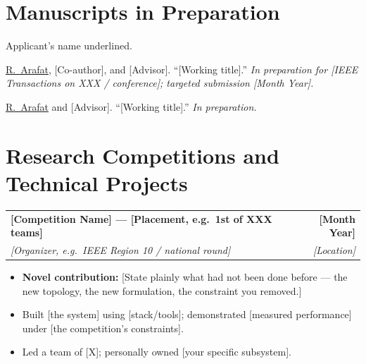 \documentclass[11pt,letterpaper]{article}   %
\makeatletter
\newcommand{\entry}[4]{%
  \vspace{3pt}%
  \noindent\begin{tabularx}{\textwidth}{@{}X r@{}}
    \textbf{#1} & \textbf{#2}\\
    \textit{\textcolor{subtle}{#3}} & \textit{\textcolor{subtle}{#4}}\\
  \end{tabularx}%
  \vspace{-4pt}%
}
\newcommand{\me}[1]{\underline{#1}}          %
\makeatother
\begin{document}
\section{Manuscripts in Preparation}
{\small\textcolor{subtle}{Applicant's name underlined.}}
\begin{enumerate}[leftmargin=2.2em,label={[M\arabic*]},itemsep=3pt,topsep=4pt]
  \item \me{R.~Arafat}, [Co-author], and [Advisor]. ``[Working title].''
        \textit{In preparation for [IEEE Transactions on XXX / conference];
        targeted submission [Month Year].}
  \item \me{R.~Arafat} and [Advisor]. ``[Working title].'' \textit{In preparation.}
\end{enumerate}


\section{Research Competitions and Technical Projects}

\entry{[Competition Name] --- [Placement, e.g.\ 1st of XXX teams]}{[Month Year]}
      {[Organizer, e.g.\ IEEE Region 10 / national round]}{[Location]}
\begin{itemize}
  \item \textbf{Novel contribution:} [State plainly what had not been done before —
        the new topology, the new formulation, the constraint you removed.]
  \item Built [the system] using [stack/tools]; demonstrated [measured performance]
        under [the competition's constraints].
  \item Led a team of [X]; personally owned [your specific subsystem].
\end{itemize}
\end{document}
